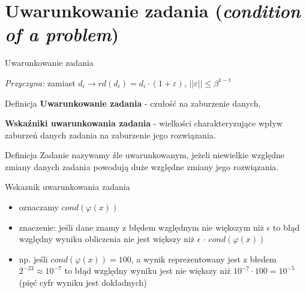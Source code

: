 \section{Uwarunkowanie zadania ({\it condition of a problem})}
\begin{frame}{Uwarunkowanie zadania}

	{\it Przyczyna:} zamiast 
    	$d_i \rightarrow rd(d_i) = d_i \cdot (1 + \varepsilon)$,
        $||\varepsilon|| \le \beta^{1-t}$
        
    \begin{block}{Definicja}
    	{\bf Uwarunkowanie zadania} - czułość na zaburzenie danych,
        
        {\bf Wskaźniki uwarunkowania zadania} - wielkości charakteryzujące wpływ zaburzeń danych zadania na zaburzenie jego rozwiązania.
    \end{block}
    
    \begin{block}{Definicja}
    Zadanie nazywamy źle uwarunkowanym, jeżeli niewielkie względne zmiany danych zadania powodują duże względne zmiany jego rozwiązania.
    \end{block}
\end{frame}

\begin{frame}{Wskaznik uwarunkowania zadania}
\begin{itemize}
    \item oznaczamy $cond(\varphi(x))$
    \item znaczenie: jeśli dane znamy z błędem względnym nie większym niż $\epsilon$ to błąd względny wyniku  obliczenia nie jest większy niż $\epsilon$ $\cdot$  $cond(\varphi(x))$
    \item np. jeśli $cond(\varphi(x))=100$, a wynik reprezentowany jest z błedem $2^{-23} \approx 10^{-7}$ to błąd względny wyniku jest nie większy niż $10^{-7} \cdot 100 = 10^{-5}$ (pięć cyfr wyniku jest dokładnych)
\end{itemize}
\end{frame}

